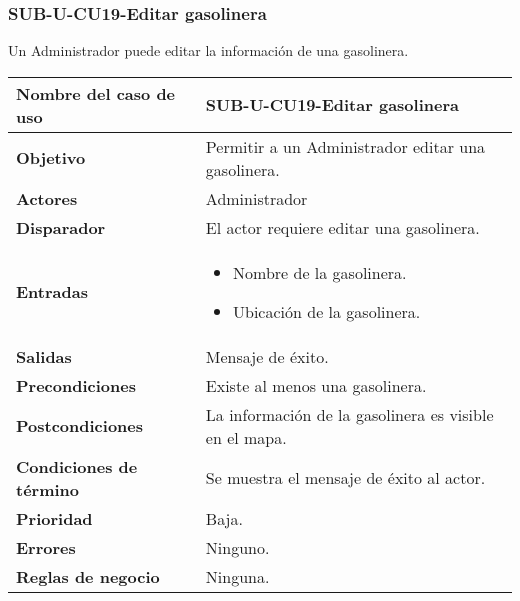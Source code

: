 \subsubsection{SUB-U-CU19-Editar gasolinera}\label{SUB-U-CU19}
Un Administrador puede editar la información de una gasolinera.

\begin{longtable}{|J{5cm}|J{10.3cm}|}
	\hline
	\textbf{Nombre del caso de uso} &
		SUB-U-CU19-Editar gasolinera \\ \hline
	\textbf{Objetivo} &
		Permitir a un Administrador editar una gasolinera. \\ \hline
	\textbf{Actores} &
		Administrador \\ \hline 
	\textbf{Disparador} & 
		El actor requiere editar una gasolinera. \\ \hline 
	\textbf{Entradas} & 
		\begin{itemize}
				\item Nombre de la gasolinera.
				\item Ubicación de la gasolinera.
		\end{itemize}\\ \hline 
	\textbf{Salidas} & Mensaje de éxito.
		\\ \hline
	\textbf{Precondiciones} & Existe al menos una gasolinera.
		\\ \hline
	\textbf{Postcondiciones} & La información de la gasolinera es visible en el mapa.
		\\ \hline
	\textbf{Condiciones de término} & Se muestra el mensaje de éxito al actor.
		\\ \hline 
	\textbf{Prioridad} & 
		Baja. \\ \hline
	\textbf{Errores} & Ninguno.
		\\ \hline
	\textbf{Reglas de negocio} & Ninguna.
		 \\ \hline
\end{longtable}

